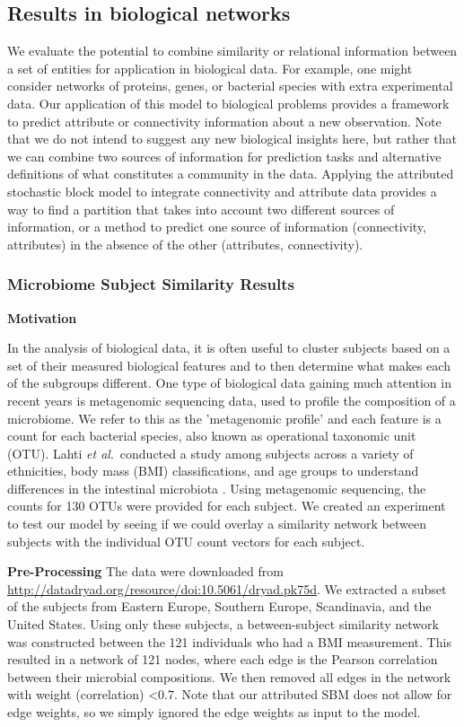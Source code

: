 \subsection{Results in biological networks}
We evaluate the potential to combine similarity or relational information between a set of entities for application in biological data. For example, one might consider networks of proteins, genes, or bacterial species with extra experimental data. Our application of this model to biological problems provides a framework to predict attribute or connectivity information about a new observation.  Note that we do not intend to suggest any new biological insights here, but rather that we can combine two sources of information for prediction tasks and alternative definitions of what constitutes a community in the data. Applying the attributed stochastic block model to integrate connectivity and attribute data provides a way to find a partition that takes into account two different sources of information, or a method to predict one source of information (connectivity, attributes) in the absence of the other (attributes, connectivity). 

\subsubsection{Microbiome Subject Similarity Results}

{\bf Motivation}

In the analysis of biological data, it is often useful to cluster subjects based on a set of their measured biological features and to then determine what makes each of the subgroups different. One type of biological data gaining much attention in recent years is metagenomic sequencing data, used to profile the composition of a microbiome. We refer to this as the 'metagenomic profile' and each feature is a count for each bacterial species, also known as operational taxonomic unit (OTU). Lahti \emph{et al}.\ conducted a study among subjects across a variety of ethnicities, body mass (BMI) classifications, and age groups to understand differences in the intestinal microbiota \cite{microbiomedata}. Using metagenomic sequencing, the counts for 130 OTUs were provided for each subject. We created an experiment to test our model by seeing if we could overlay a similarity network between subjects with the individual OTU count vectors for each subject. 

{\bf Pre-Processing}
The data were downloaded from \url{http://datadryad.org/resource/doi:10.5061/dryad.pk75d}. We extracted a subset of the subjects from Eastern Europe, Southern Europe, Scandinavia, and the United States. Using only these subjects, a between-subject similarity network was constructed between the 121 individuals who had a BMI measurement. This resulted in a network of 121 nodes, where each edge is the Pearson correlation between their microbial compositions. We then removed all edges in the network with weight (correlation) <0.7. Note that our attributed SBM does not allow for edge weights, so we simply ignored the edge weights as input to the model.

